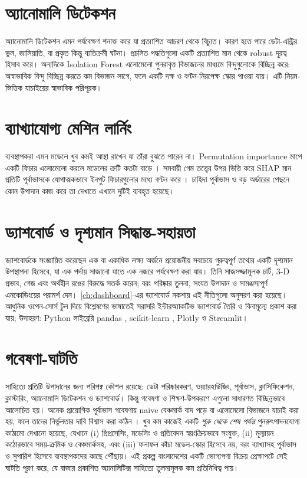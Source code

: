 \section{অ্যানোমালি ডিটেকশন}
অ্যানোমালি ডিটেকশন এমন পর্যবেক্ষণ শনাক্ত করে যা প্রত্যাশিত আচরণ থেকে বিচ্যুত। কারণ হতে পারে ডেটা-এন্ট্রির ভুল, জালিয়াতি, বা প্রকৃত
কিন্তু ব্যতিক্রমী ঘটনা। প্রচলিত পদ্ধতিগুলো একটি প্রত্যাশিত মান থেকে robust দূরত্ব হিসাব করে। অন্যদিকে Isolation Forest
\citep{liu2008} এলোমেলো পুনরাবৃত্ত বিভাজনের মাধ্যমে বিন্দুগুলোকে বিচ্ছিন্ন করে: অস্বাভাবিক বিন্দু বিচ্ছিন্ন করতে কম বিভাজন লাগে,
ফলে একটি দক্ষ ও বণ্টন-নিরপেক্ষ স্কোর পাওয়া যায়। এটি নিয়ম-ভিত্তিক যাচাইয়ের স্বাভাবিক পরিপূরক।

\section{ব্যাখ্যাযোগ্য মেশিন লার্নিং}
ব্যবস্থাপকরা এমন মডেলে খুব কমই আস্থা রাখেন যা তাঁরা বুঝতে পারেন না। Permutation importance মাপে একটি ফিচার এলোমেলো করলে
মডেলের ত্রুটি কতটা বাড়ে \citep{breiman2001}। সমবায়ী গেম তত্ত্বের উপর ভিত্তি করে SHAP মান প্রতিটি পূর্বাভাসকে যোগাত্মকভাবে
ইনপুট ফিচারগুলোর মধ্যে বণ্টন করে \citep{lundberg2017}। চাহিদা পূর্বাভাস ও বড় অর্ডারের পেছনে কোন উপাদান কাজ করে তা দেখাতে
এখানে দুটিই ব্যবহৃত হয়েছে।

\section{ড্যাশবোর্ড ও দৃশ্যমান সিদ্ধান্ত-সহায়তা}
\citet{few2013} ড্যাশবোর্ডকে সংজ্ঞায়িত করেছেন এক বা একাধিক লক্ষ্য অর্জনে প্রয়োজনীয় সবচেয়ে গুরুত্বপূর্ণ তথ্যের একটি দৃশ্যমান
উপস্থাপনা হিসেবে, যা এক পর্দায় সাজানো যাতে এক নজরে পর্যবেক্ষণ করা যায়। তিনি সাজসজ্জামূলক চার্ট, 3-D প্রভাব, গেজ এবং অর্থহীন
রঙের বিরুদ্ধে সতর্ক করেন; বরং পরিষ্কার তুলনা, সংযত উপাদান ও সামঞ্জস্যপূর্ণ এনকোডিংয়ের পরামর্শ দেন। \cref{ch:dashboard}-এর
ড্যাশবোর্ড নকশায় এই নীতিগুলো অনুসরণ করা হয়েছে। আধুনিক ওপেন-সোর্স টুল দিয়ে বিশ্লেষণের ভাষাতেই সরাসরি ইন্টারঅ্যাকটিভ
ড্যাশবোর্ড তৈরি ও বিনামূল্যে প্রকাশ করা যায়; উদাহরণ: Python লাইব্রেরি pandas \citep{mckinney2022}, scikit-learn
\citep{pedregosa2011}, Plotly ও Streamlit।

\section{গবেষণা-ঘাটতি}
সাহিত্যে প্রতিটি উপাদানের জন্য পরিপক্ব কৌশল রয়েছে: ডেটা পরিষ্কারকরণ, ওয়্যারহাউজিং, পূর্বাভাস, ক্লাসিফিকেশন, ক্লাস্টারিং,
অ্যানোমালি ডিটেকশন ও ড্যাশবোর্ড। কিন্তু গবেষণা ও শিক্ষণ-উপকরণে এগুলো সাধারণত বিচ্ছিন্নভাবে আলোচিত হয়। অনেক প্রায়োগিক পূর্বাভাস
গবেষণায় naive বেঞ্চমার্ক বাদ পড়ে বা এলোমেলো বিভাজনে যাচাই করা হয়, ফলে তাদের নির্ভুলতার দাবি বিশ্বাস করা কঠিন
\citep{makridakis2018, kaufman2012}। খুব কম কাজেই একটি \emph{শুরু থেকে শেষ পর্যন্ত} পুনরুৎপাদনযোগ্য কাঠামো দেখানো হয়েছে,
যেখানে (i) প্রিপ্রসেসিং, মডেলিং ও প্রতিবেদন স্বয়ংক্রিয়ভাবে সংযুক্ত, (ii) মূল্যায়ন কঠোরভাবে সময়-ক্রমিক ও বেঞ্চমার্কসহ, এবং
(iii) ফলাফল কাঁচা মডেল-স্কোর হিসেবে নয়, বরং ব্যাখ্যাসহ পূর্বাভাস ও সুপারিশ হিসেবে ব্যবস্থাপকদের কাছে পৌঁছায়। এই প্রকল্প
বাংলাদেশের একটি ভোগ্যপণ্য বিক্রয় প্রেক্ষাপটে সেই ঘাটতি পূরণ করে, যে বাজার প্রকাশিত অ্যানালিটিক্স সাহিত্যে তুলনামূলক কম প্রতিনিধিত্ব পায়।

